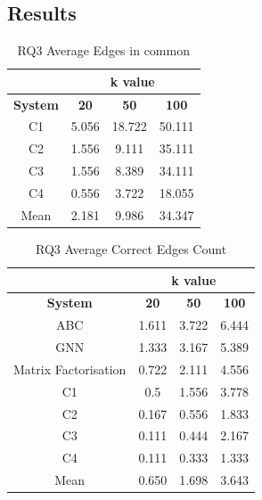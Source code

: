 \documentclass{l4proj}
\begin{document}
\subsection{Results}

\begin{table}[h]
    \centering
    \caption{RQ3 Average Edges in common}
    \label{tab:rq3_common}
    \begin{tabular}{|c|c|c|c|}
    \hline
    & \multicolumn{3}{|c|}{k value}\\ \hline
    \textbf{System} & \textbf{20} & \textbf{50} & \textbf{100} \\ \hline
    C1 & 5.056 & 18.722 & 50.111  \\ \hline
    C2 & 1.556 & 9.111 & 35.111\\ \hline
    C3 & 1.556 & 8.389 & 34.111\\ \hline
    C4 & 0.556 & 3.722 & 18.055\\ \hline
    Mean & 2.181 & 9.986 & 34.347\\ \hline
    \end{tabular}
\end{table}

\begin{table}[h]
    \centering
    \caption{RQ3 Average Correct Edges Count}
    \label{tab:rq3_correct}
    \begin{tabular}{|c|c|c|c|}
    \hline
    & \multicolumn{3}{|c|}{k value} \\ \hline
    \textbf{System} & \textbf{20} & \textbf{50} & \textbf{100}\\ \hline
    ABC & 1.611 & 3.722 & 6.444 \\ \hline
    GNN & 1.333 & 3.167 & 5.389 \\ \hline
    Matrix Factorisation & 0.722 & 2.111 & 4.556 \\ \hline
    C1 & 0.5 & 1.556 & 3.778 \\ \hline
    C2 & 0.167 & 0.556 & 1.833 \\ \hline
    C3 & 0.111 & 0.444 & 2.167 \\ \hline
    C4 & 0.111 & 0.333 & 1.333 \\ \hline
    Mean & 0.650 & 1.698 & 3.643 \\ \hline
    \end{tabular}
\end{table}
\end{document}
